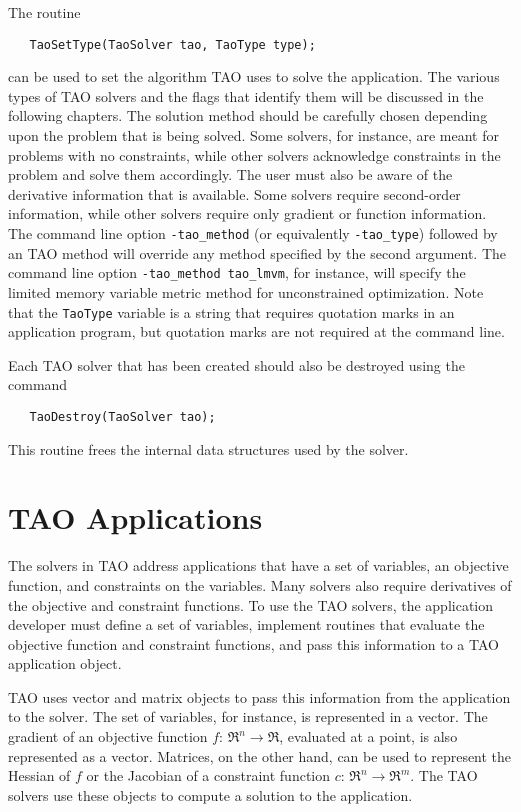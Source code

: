 The routine
\begin{verbatim}
   TaoSetType(TaoSolver tao, TaoType type);
\end{verbatim}
\noindent
can be used to set the algorithm TAO uses to solve the application.
The various types of TAO solvers and the flags that identify them 
will be discussed in the following chapters.
The solution method should be carefully chosen depending upon
the problem that is being solved.  Some solvers, for instance, are meant for
problems with no constraints, while other solvers acknowledge constraints
in the problem and solve them accordingly.
The user must also be aware of the derivative information that is available.
Some solvers require second-order information, while other solvers require
only gradient or function information.
The command line option \texttt{-tao\_method} (or equivalently 
\texttt{-tao\_type}) followed by an TAO method
will override any method specified by the second argument.
The command line option {\tt -tao\_method tao\_lmvm}, for instance,
will specify the limited memory variable metric method for unconstrained
optimization.  Note that the {\tt TaoType} variable is a string that requires
quotation marks in an application program, but quotation marks are not required
at the command line.

Each TAO solver that has been created should also be destroyed using
the command 
\begin{verbatim}
   TaoDestroy(TaoSolver tao);
\end{verbatim}
\noindent 
This routine frees the internal data structures used by the solver.


\section{TAO Applications}
\label{section:taoapplication}
\label{section:petscapp}

The solvers in TAO address applications that have a set of variables, an objective
function, and constraints on the variables.  Many solvers also require derivatives
of the objective and constraint functions.
To use the TAO solvers, the application developer must 
define a set of variables, implement routines that evaluate the 
objective function and constraint functions, and pass this information
to a TAO application object.   

TAO uses vector and matrix objects to pass this information from the
application to the solver.   The set of variables, for instance, is
represented in a vector.
The gradient of an objective function $f: \, \Re^n \to \Re$,
evaluated at a point, is also represented as a vector.
Matrices,  on the other hand,
can be used to represent the Hessian of $f$ or the Jacobian of a constraint
function $c: \, \Re^n \to \Re^m$.  The TAO solvers use
these objects to compute a solution to the application.

